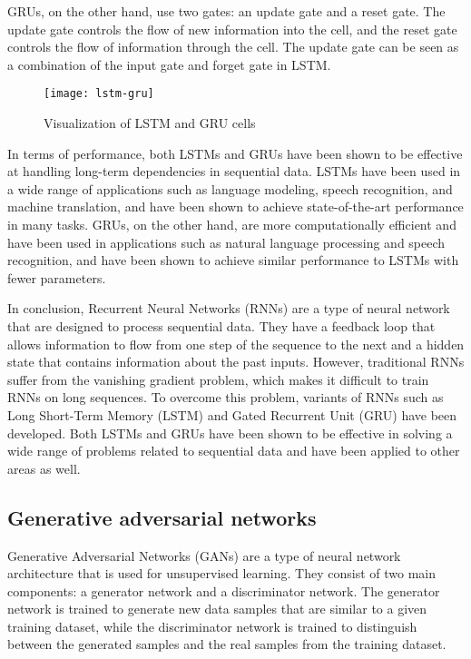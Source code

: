 GRUs, on the other hand, use two gates: an update gate and a reset gate.
The update gate controls the flow of new information into the cell, and the reset gate controls the flow of information through the cell.
The update gate can be seen as a combination of the input gate and forget gate in LSTM.

\begin{figure}[H]
  \centering
  \texttt{[image: lstm-gru]}
  \caption{Visualization of LSTM and GRU cells \cite{phi}}
\end{figure}

In terms of performance, both LSTMs and GRUs have been shown to be effective at handling long-term dependencies in sequential data.
LSTMs have been used in a wide range of applications such as language modeling, speech recognition, and machine translation, and have been shown to achieve state-of-the-art performance in many tasks.
GRUs, on the other hand, are more computationally efficient and have been used in applications such as natural language processing and speech recognition, and have been shown to achieve similar performance to LSTMs with fewer parameters.

In conclusion, Recurrent Neural Networks (RNNs) are a type of neural network that are designed to process sequential data.
They have a feedback loop that allows information to flow from one step of the sequence to the next and a hidden state that contains information about the past inputs.
However, traditional RNNs suffer from the vanishing gradient problem, which makes it difficult to train RNNs on long sequences.
To overcome this problem, variants of RNNs such as Long Short-Term Memory (LSTM) and Gated Recurrent Unit (GRU) have been developed. Both LSTMs and GRUs have been shown to be effective in solving a wide range of problems related to sequential data and have been applied to other areas as well.

\subsection{Generative adversarial networks}
Generative Adversarial Networks (GANs) \cite{goodfellow2014generative, mirza2014conditional} are a type of neural network architecture that is used for unsupervised learning.
They consist of two main components: a generator network and a discriminator network.
The generator network is trained to generate new data samples that are similar to a given training dataset, while the discriminator network is trained to distinguish between the generated samples and the real samples from the training dataset.

